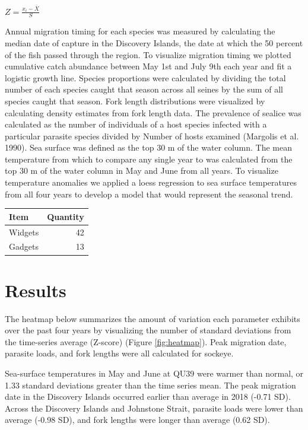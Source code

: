 \documentclass[fleqn,10pt]{wlpeerj} %
\begin{document}
\(Z = {\frac{x_i - \bar X}{{S}}}\)

Annual migration timing for each species was measured by calculating the
median date of capture in the Discovery Islands, the date at which the
50 percent of the fish passed through the region. To visualize migration
timing we plotted cumulative catch abundance between May 1st and July
9th each year and fit a logistic growth line. Species proportions were
calculated by dividing the total number of each species caught that
season across all seines by the sum of all species caught that season.
Fork length distributions were visualized by calculating density
estimates from fork length data. The prevalence of sealice was
calculated as the number of individuals of a host species infected with
a particular parasite species divided by Number of hosts examined
(Margolis et al. 1990). Sea surface was defined as the top 30 m of the
water column. The mean temperature from which to compare any single year
to was calculated from the top 30 m of the water column in May and June
from all years. To visualize temperature anomalies we applied a loess
regression to sea surface temperatures from all four years to develop a
model that would represent the seasonal trend.

\begin{longtable}[]{@{}lr@{}}
\toprule
Item & Quantity\tabularnewline
\midrule
\endhead
Widgets & 42\tabularnewline
Gadgets & 13\tabularnewline
\bottomrule
\end{longtable}

\section*{Results}\label{results}

The heatmap below summarizes the amount of variation each parameter
exhibits over the past four years by visualizing the number of standard
deviations from the time-series average (Z-score) (Figure
\ref{fig:heatmap}). Peak migration date, parasite loads, and fork
lengths were all calculated for sockeye.

Sea-surface temperatures in May and June at QU39 were warmer than
normal, or 1.33 standard deviations greater than the time series mean.
The peak migration date in the Discovery Islands occurred earlier than
average in 2018 (-0.71 SD). Across the Discovery Islands and Johnstone
Strait, parasite loads were lower than average (-0.98 SD), and fork
lengths were longer than average (0.62 SD).
\end{document}
